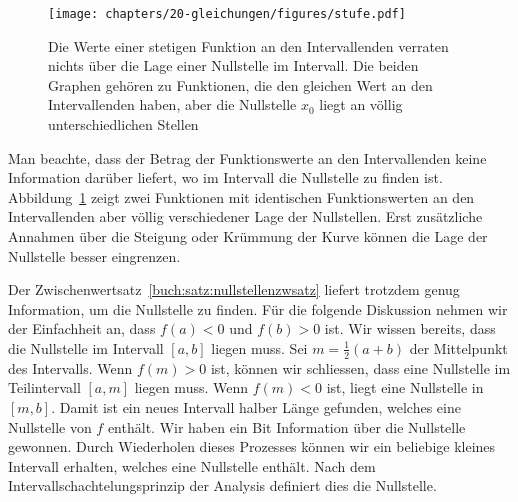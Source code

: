 \begin{figure}
\centering
\texttt{[image: chapters/20-gleichungen/figures/stufe.pdf]}
\caption{Die Werte einer stetigen Funktion an den Intervallenden verraten
nichts über die Lage einer Nullstelle im Intervall.
Die beiden Graphen gehören zu Funktionen, die den gleichen Wert an den
Intervallenden haben, aber die Nullstelle $x_0$ liegt an völlig
unterschiedlichen Stellen
\label{buch:figure:stufe}}
\end{figure}

Man beachte, dass der Betrag der Funktionswerte an den Intervallenden keine
Information darüber liefert, wo im Intervall die Nullstelle zu finden ist.
Abbildung~\ref{buch:figure:stufe} zeigt zwei Funktionen mit identischen
Funktionswerten an den Intervallenden aber völlig verschiedener Lage
der Nullstellen.
Erst zusätzliche Annahmen über die Steigung oder Krümmung der Kurve können
die Lage der Nullstelle besser eingrenzen.
%
%

Der Zwischenwertsatz~\ref{buch:satz:nullstellenzwsatz} liefert trotzdem
genug Information, um die Nullstelle zu finden.
Für die folgende Diskussion nehmen wir der Einfachheit an, dass $f(a)<0$
und $f(b)>0$ ist.
Wir wissen bereits, dass die Nullstelle im Intervall $[a,b]$ liegen muss.
Sei $m=\frac12(a+b)$ der Mittelpunkt des Intervalls.
Wenn $f(m) > 0$ ist, können wir schliessen, dass eine Nullstelle im
Teilintervall $[a,m]$ liegen muss.
Wenn $f(m) <0$ ist, liegt eine Nullstelle in $[m,b]$.
Damit ist ein neues Intervall halber Länge gefunden, welches eine
Nullstelle von $f$ enthält.
Wir haben ein Bit Information über die Nullstelle gewonnen.
Durch Wiederholen dieses Prozesses können wir ein beliebige kleines
Intervall erhalten, welches eine Nullstelle enthält.
Nach dem Intervallschachtelungsprinzip der Analysis definiert dies
die Nullstelle.
%

